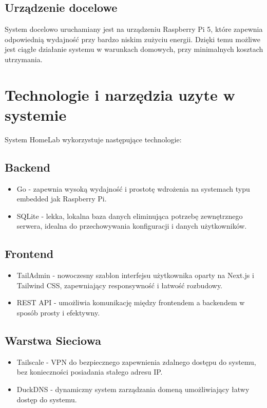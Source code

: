 \subsection{Urządzenie docelowe}

System docelowo uruchamiany jest na urządzeniu Raspberry Pi 5, które zapewnia odpowiednią wydajność przy bardzo niskim zużyciu energii. Dzięki temu możliwe jest ciągłe działanie systemu w warunkach domowych, przy minimalnych kosztach utrzymania.


\section{Technologie i narzędzia uzyte w systemie}

System HomeLab wykorzystuje następujące technologie:
\subsection{Backend}
\begin{itemize}
    \item Go - zapewnia wysoką wydajność i prostotę wdrożenia na systemach typu embedded jak Raspberry Pi.
    \item SQLite - lekka, lokalna baza danych eliminująca potrzebę zewnętrznego serwera, idealna do przechowywania konfiguracji i danych użytkowników.
\end{itemize}
\subsection{Frontend}
\begin{itemize}
    \item TailAdmin - nowoczesny szablon interfejsu użytkownika oparty na Next.js i Tailwind CSS, zapewniający responsywność i łatwość rozbudowy.
    \item REST API - umożliwia komunikację między frontendem a backendem w sposób prosty i efektywny.
\end{itemize}
\subsection{Warstwa Sieciowa}
\begin{itemize}
    \item Tailscale - VPN do bezpiecznego zapewnienia zdalnego dostępu do systemu, bez konieczności posiadania stałego adresu IP.
    \item DuckDNS - dynamiczny system zarządzania domeną umożliwiający łatwy dostęp do systemu.
\end{itemize}
